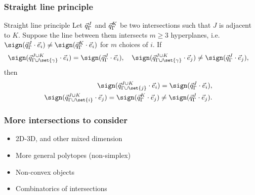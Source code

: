 \documentclass[10pt]{beamer}
\begin{document}
\begin{frame}
\frametitle{Straight line principle}

\begin{block}{Straight line principle}
Let $\vec{q}_{\Gamma}^{J}$ and $\vec{q}_{\Gamma}^{K}$ be two intersections such that $J$ is adjacent to $K$.
Suppose the line between them intersects $m \geq 3$ hyperplanes, i.e. $\signq{J}{\Gamma}{i} \neq \signq{K}{\Gamma}{i}$ for $m$ choices of $i$.
If
\begin{equation*}
	\signq{J \cup K}{\Gamma \cup \set{\gamma}}{i} = \signq{J}{\Gamma}{i}, \quad
	\signq{J \cup K}{\Gamma \cup \set{\gamma}}{j} \neq \signq{J}{\Gamma}{j},
\end{equation*}
then
\begin{align*}
	\signq{J \cup K}{\Gamma \cup \set{j}}{i} = \signq{J}{\Gamma}{i}, \\
	\signq{J \cup K}{\Gamma \cup \set{i}}{j} = \signq{K}{\Gamma}{j} \neq \signq{J}{\Gamma}{j}.
\end{align*}
\end{block}

\end{frame}
\begin{frame}

\begin{figure}
	\centering
\end{figure}

\end{frame}

\begin{frame}
\frametitle{More intersections to consider}

\begin{itemize}
\item 2D-3D, and other mixed dimension
\item More general polytopes (non-simplex)
\item Non-convex objects
\item Combinatorics of intersections
\end{itemize}

\end{frame}
\end{document}
